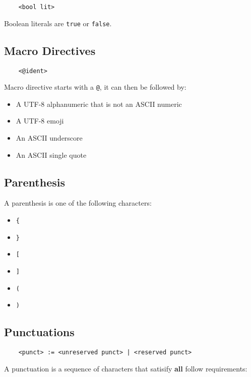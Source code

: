 \documentclass[a4paper]{article}
\begin{document}
\begin{verbatim}
    <bool lit>
\end{verbatim}

Boolean literals are \verb|true| or \verb|false|.

\subsection{Macro Directives}

\begin{verbatim}
    <@ident>
\end{verbatim}

Macro directive starts with a \verb|@|, it can then be followed by:

\begin{itemize}
    \item A UTF-8 alphanumeric that is not an ASCII numeric
    \item A UTF-8 emoji
    \item An ASCII underscore
    \item An ASCII single quote
\end{itemize}

\subsection{Parenthesis}

A parenthesis is one of the following characters:

\begin{itemize}
    \item \verb|{|
    \item \verb|}|
    \item \verb|[|
    \item \verb|]|
    \item \verb|(|
    \item \verb|)|
\end{itemize}

\subsection{Punctuations}

\begin{verbatim}
    <punct> := <unreserved punct> | <reserved punct>
\end{verbatim}

A punctuation is a sequence of characters that satisify {\bf all} follow requirements:
\end{document}

